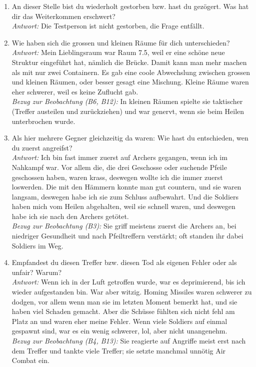 \documentclass[../Main.tex]{subfiles}
\begin{document}
\begin{enumerate}[label=\textbf{I\arabic*}, leftmargin=1.5cm, itemsep=1em]
\item An dieser Stelle bist du wiederholt gestorben bzw. hast du gezögert. Was hat dir das Weiterkommen erschwert? \\
    \textit{Antwort:} Die Testperson ist nicht gestorben, die Frage entfällt.

\item Wie haben sich die grossen und kleinen Räume für dich unterschieden? \\
    \textit{Antwort:} Mein Lieblingsraum war Raum 7.5, weil er eine schöne neue Struktur eingeführt hat, nämlich die Brücke. Damit kann man mehr machen als mit nur zwei Containern. Es gab eine coole Abwechslung zwischen grossen und kleinen Räumen, oder besser gesagt eine Mischung. Kleine Räume waren eher schwerer, weil es keine Zuflucht gab. \\
    \textit{Bezug zur Beobachtung (B6, B12):} In kleinen Räumen spielte sie taktischer (Treffer austeilen und zurückziehen) und war genervt, wenn sie beim Heilen unterbrochen wurde.

\item Als hier mehrere Gegner gleichzeitig da waren: Wie hast du entschieden, wen du zuerst angreifst? \\
    \textit{Antwort:} Ich bin fast immer zuerst auf Archers gegangen, wenn ich im Nahkampf war. Vor allem die, die drei Geschosse oder suchende Pfeile geschossen haben, waren krass, deswegen wollte ich die immer zuerst loswerden. Die mit den Hämmern konnte man gut countern, und sie waren langsam, deswegen habe ich sie zum Schluss aufbewahrt. Und die Soldiers haben mich vom Heilen abgehalten, weil sie schnell waren, und deswegen habe ich sie nach den Archers getötet. \\
    \textit{Bezug zur Beobachtung (B3):} Sie griff meistens zuerst die Archers an, bei niedriger Gesundheit und nach Pfeiltreffern verstärkt; oft standen ihr dabei Soldiers im Weg.

\item Empfandest du diesen Treffer bzw. diesen Tod als eigenen Fehler oder als unfair? Warum? \\
    \textit{Antwort:} Wenn ich in der Luft getroffen wurde, war es deprimierend, bis ich wieder aufgestanden bin. War aber witzig. Homing Missiles waren schwerer zu dodgen, vor allem wenn man sie im letzten Moment bemerkt hat, und sie haben viel Schaden gemacht. Aber die Schüsse fühlten sich nicht fehl am Platz an und waren eher meine Fehler. Wenn viele Soldiers auf einmal gespawnt sind, war es ein wenig schwerer, lol, aber nicht unangenehm. \\
    \textit{Bezug zur Beobachtung (B4, B13):} Sie reagierte auf Angriffe meist erst nach dem Treffer und tankte viele Treffer; sie setzte manchmal unnötig Air Combat ein.


\end{enumerate}
\end{document}
